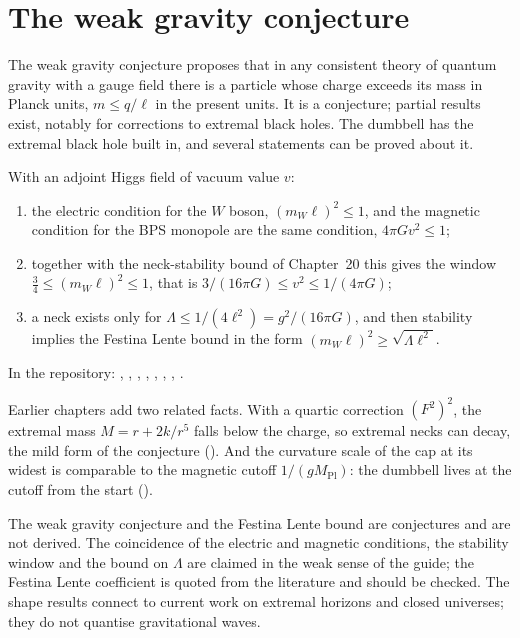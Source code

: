 \section{The weak gravity conjecture}

The weak gravity conjecture proposes that in any consistent theory of quantum gravity with a gauge field there is a particle whose charge exceeds its mass in Planck units, $m\le q/\ell$ in the present units. It is a conjecture; partial results exist, notably for corrections to extremal black holes. The dumbbell has the extremal black hole built in, and several statements can be proved about it.

\begin{theorem}\proved\label{thm:wgc}
With an adjoint Higgs field of vacuum value $v$:
\begin{enumerate}[label=(\roman*)]
\item the electric condition for the $W$ boson, $(m_W\ell)^2\le1$, and the magnetic condition for the BPS monopole are the same condition, $4\pi Gv^2\le1$;
\item together with the neck-stability bound of Chapter~20 this gives the window $\tfrac34\le(m_W\ell)^2\le1$, that is $3/(16\pi G)\le v^2\le1/(4\pi G)$;
\item a neck exists only for $\Lambda\le1/(4\ell^2)=g^2/(16\pi G)$, and then stability implies the Festina Lente bound in the form $(m_W\ell)^2\ge\sqrt{\Lambda\ell^2}$.
\end{enumerate}
\end{theorem}
\noindent In the repository: , , , , , , , .

Earlier chapters add two related facts. With a quartic correction $(F^2)^2$, the extremal mass $M=r+2k/r^5$ falls below the charge, so extremal necks can decay, the mild form of the conjecture (). And the curvature scale of the cap at its widest is comparable to the magnetic cutoff $1/(gM_{\mathrm{Pl}})$: the dumbbell lives at the cutoff from the start ().

\begin{standsbox}
The weak gravity conjecture and the Festina Lente bound are conjectures and are not derived. The coincidence of the electric and magnetic conditions, the stability window and the bound on $\Lambda$ are claimed in the weak sense of the guide; the Festina Lente coefficient is quoted from the literature and should be checked. The shape results connect to current work on extremal horizons and closed universes; they do not quantise gravitational waves. \open
\end{standsbox}

